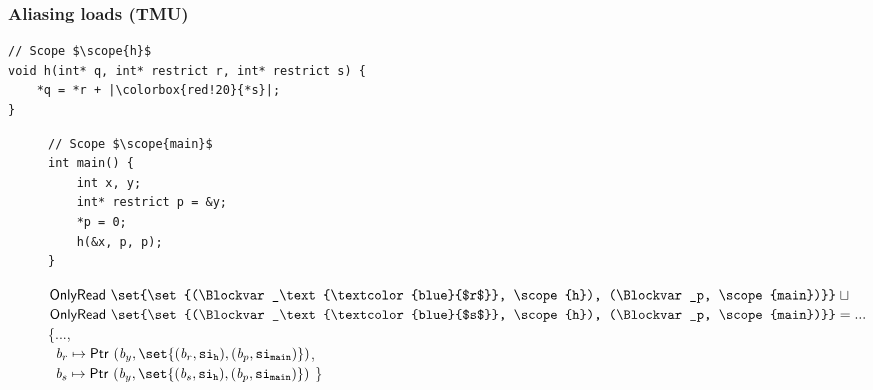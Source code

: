 \begin{frame}[fragile]
\frametitle{Aliasing loads (TMU)}
\begin{verbatim}
// Scope $\scope{h}$
void h(int* q, int* restrict r, int* restrict s) {
    *q = *r + |\colorbox{red!20}{*s}|; 
}
\end{verbatim}
\vspace*{-1cm}
\begin{figure}[!h]
\begin{minipage}[t]{.36\textwidth}

\begin{verbatim}
// Scope $\scope{main}$
int main() {
    int x, y;
    int* restrict p = &y;
    *p = 0;
    h(&x, p, p);
}
\end{verbatim}
\end{minipage}%
\begin{minipage}{.64\textwidth}
\colorbox{red!20}{$\onlyread{\set{\set{(\Blockvar_\text{\textcolor{blue}{$r$}}, \scope{h}), (\Blockvar_p, \scope{main})}}} \joinsym $} \\
\colorbox{red!20}{$\onlyread{\set{\set{(\Blockvar_\text{\textcolor{blue}{$s$}}, \scope{h}), (\Blockvar_p, \scope{main})}}} = ...$}
\\

\executionannotation
{
\{..., \\\  $\Blockvar_r \mapsto \ptr{(\Blockvar_y, \set{(\Blockvar_r, \scope{h}), (\Blockvar_p, \scope{main})})} $, \\
            \ $\Blockvar_s \mapsto \ptr{(\Blockvar_y, \set{(\Blockvar_s, \scope{h}), (\Blockvar_p, \scope{main})})}$ \}
}
{
}
\end{minipage}
\end{figure}

\end{frame}


